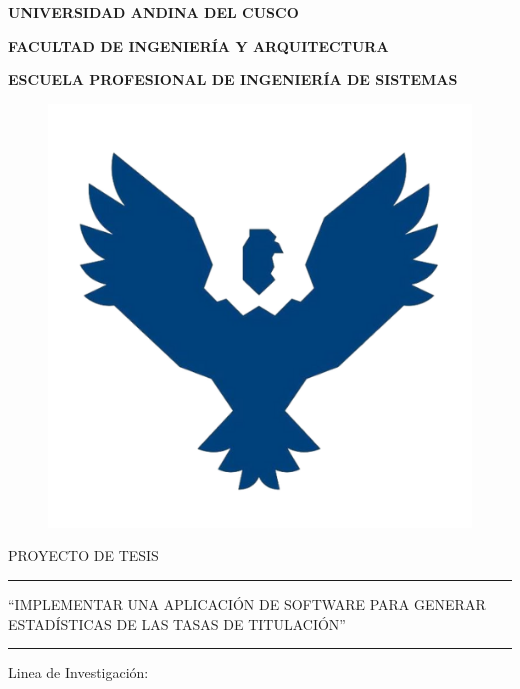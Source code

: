 \begin{titlepage}
	\begin{center}
		{\LARGE \textbf{UNIVERSIDAD ANDINA DEL CUSCO}}
		
		\vspace{0.5cm}
		{\large \textbf{FACULTAD DE INGENIERÍA Y ARQUITECTURA}}
		
		\vspace{0.5cm}		
		{\large \textbf{ESCUELA PROFESIONAL DE INGENIERÍA DE SISTEMAS}}
		\begin{figure}[h]
			\centering	
			\includegraphics[scale=0.40]{imagenes/logo.png}		
		\end{figure}
		
		{\large {PROYECTO DE TESIS}}
		
		\rule{163mm}{0.3mm}		
		\vspace{1mm}
		
		\begin{spacing}{1}
			{\large ``IMPLEMENTAR UNA APLICACIÓN DE SOFTWARE PARA GENERAR ESTADÍSTICAS DE LAS TASAS DE TITULACIÓN''}
		\end{spacing} 
		
		\vspace{2mm}
		\rule{163mm}{0.3mm}
		\vspace{0.5cm}
		
		{\large {Linea de Investigación: }}
		\vspace{0.5cm}
		

\end{center}
\end{titlepage}
